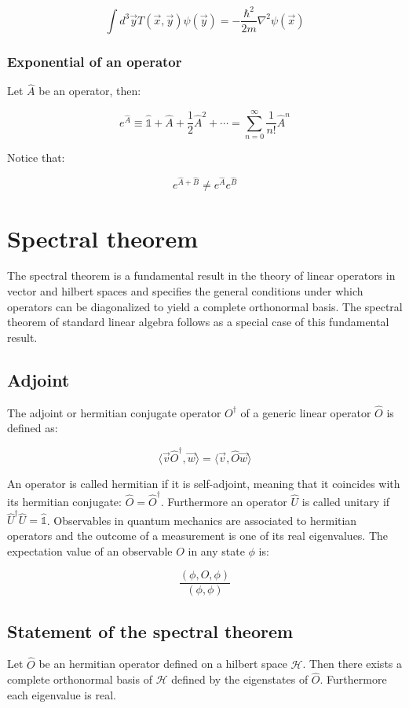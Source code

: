 		$$\int d^3\vec{y}T(\vec{x}, \vec{y})\psi(\vec{y}) = -\frac{\hbar^2}{2m}\nabla^2\psi(\vec{x})$$

		\subsubsection{Exponential of an operator}
		Let $\hat{A}$ be an operator, then:

		$$e^{\hat{A}} \equiv\hat{\mathds{1}} + \hat{A} + \frac{1}{2}\hat{A}^2+\cdots = \sum\limits_{n=0}^\infty\frac{1}{n!}\hat{A}^n$$

		Notice that:

		$$e^{\hat{A} + \hat{B}} \neq e^{\hat{A}}e^{\hat{B}}$$

\section{Spectral theorem}
The spectral theorem is a fundamental result in the theory of linear operators in vector and hilbert spaces and specifies the general conditions under which operators can be diagonalized to yield a complete orthonormal basis.
The spectral theorem of standard linear algebra follows as a special case of this fundamental result.

	\subsection{Adjoint}
	The adjoint or hermitian conjugate operator $O^\dagger$ of a generic linear operator $\hat{O}$ is defined as:

	$$\langle \vec{v}\hat{O}^\dagger, \vec{w}\rangle = \langle\vec{v}, \hat{O}\vec{w}\rangle$$

	An operator is called hermitian if it is self-adjoint, meaning that it coincides with its hermitian conjugate: $\hat{O} = \hat{O}^\dagger$.
	Furthermore an operator $\hat{U}$ is called unitary if $\hat{U}^\dagger\hat{U} = \hat{\mathds{1}}$.
	Observables in quantum mechanics are associated to hermitian operators and the outcome of a measurement is one of its real eigenvalues.
	The expectation value of an observable $O$ in any state $\phi$ is:

	$$\frac{(\phi,O,\phi)}{(\phi,\phi)}$$

	\subsection{Statement of the spectral theorem}
	Let $\hat{O}$ be an hermitian operator defined on a hilbert space $\mathcal{H}$.
	Then there exists a complete orthonormal basis of $\mathcal{H}$ defined by the eigenstates of $\hat{O}$.
	Furthermore each eigenvalue is real.

